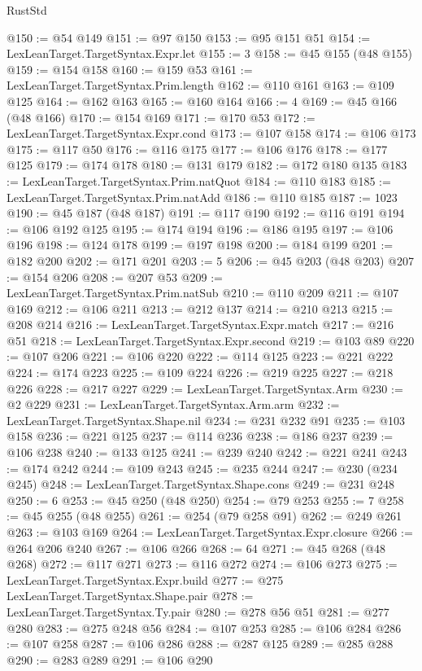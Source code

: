 \begin{lexlean}{RustStd}
\begin{coremodule}
@150 := @54 @149
@151 := @97 @150
@153 := @95 @151 @51
@154 := LexLeanTarget.TargetSyntax.Expr.let
@155 := 3
@158 := @45 @155 (@48 @155)
@159 := @154 @158
@160 := @159 @53
@161 := LexLeanTarget.TargetSyntax.Prim.length
@162 := @110 @161
@163 := @109 @125
@164 := @162 @163
@165 := @160 @164
@166 := 4
@169 := @45 @166 (@48 @166)
@170 := @154 @169
@171 := @170 @53
@172 := LexLeanTarget.TargetSyntax.Expr.cond
@173 := @107 @158
@174 := @106 @173
@175 := @117 @50
@176 := @116 @175
@177 := @106 @176
@178 := @177 @125
@179 := @174 @178
@180 := @131 @179
@182 := @172 @180 @135
@183 := LexLeanTarget.TargetSyntax.Prim.natQuot
@184 := @110 @183
@185 := LexLeanTarget.TargetSyntax.Prim.natAdd
@186 := @110 @185
@187 := 1023
@190 := @45 @187 (@48 @187)
@191 := @117 @190
@192 := @116 @191
@194 := @106 @192 @125
@195 := @174 @194
@196 := @186 @195
@197 := @106 @196
@198 := @124 @178
@199 := @197 @198
@200 := @184 @199
@201 := @182 @200
@202 := @171 @201
@203 := 5
@206 := @45 @203 (@48 @203)
@207 := @154 @206
@208 := @207 @53
@209 := LexLeanTarget.TargetSyntax.Prim.natSub
@210 := @110 @209
@211 := @107 @169
@212 := @106 @211
@213 := @212 @137
@214 := @210 @213
@215 := @208 @214
@216 := LexLeanTarget.TargetSyntax.Expr.match
@217 := @216 @51
@218 := LexLeanTarget.TargetSyntax.Expr.second
@219 := @103 @89
@220 := @107 @206
@221 := @106 @220
@222 := @114 @125
@223 := @221 @222
@224 := @174 @223
@225 := @109 @224
@226 := @219 @225
@227 := @218 @226
@228 := @217 @227
@229 := LexLeanTarget.TargetSyntax.Arm
@230 := @2 @229
@231 := LexLeanTarget.TargetSyntax.Arm.arm
@232 := LexLeanTarget.TargetSyntax.Shape.nil
@234 := @231 @232 @91
@235 := @103 @158
@236 := @221 @125
@237 := @114 @236
@238 := @186 @237
@239 := @106 @238
@240 := @133 @125
@241 := @239 @240
@242 := @221 @241
@243 := @174 @242
@244 := @109 @243
@245 := @235 @244
@247 := @230 (@234 @245)
@248 := LexLeanTarget.TargetSyntax.Shape.cons
@249 := @231 @248
@250 := 6
@253 := @45 @250 (@48 @250)
@254 := @79 @253
@255 := 7
@258 := @45 @255 (@48 @255)
@261 := @254 (@79 @258 @91)
@262 := @249 @261
@263 := @103 @169
@264 := LexLeanTarget.TargetSyntax.Expr.closure
@266 := @264 @206 @240
@267 := @106 @266
@268 := 64
@271 := @45 @268 (@48 @268)
@272 := @117 @271
@273 := @116 @272
@274 := @106 @273
@275 := LexLeanTarget.TargetSyntax.Expr.build
@277 := @275 LexLeanTarget.TargetSyntax.Shape.pair
@278 := LexLeanTarget.TargetSyntax.Ty.pair
@280 := @278 @56 @51
@281 := @277 @280
@283 := @275 @248 @56
@284 := @107 @253
@285 := @106 @284
@286 := @107 @258
@287 := @106 @286
@288 := @287 @125
@289 := @285 @288
@290 := @283 @289
@291 := @106 @290

\end{coremodule}
\end{lexlean}
